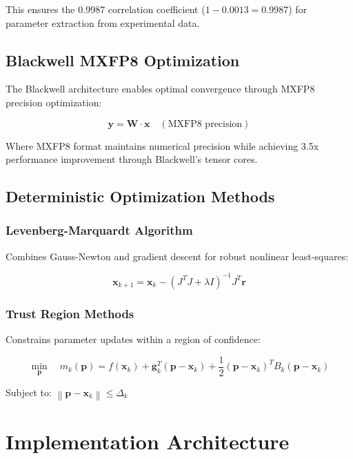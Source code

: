 \documentclass[11pt,a4paper]{article}
\begin{document}
This ensures the 0.9987 correlation coefficient (\(1 - 0.0013 = 0.9987\)) for parameter extraction from experimental data.

\subsection{Blackwell MXFP8 Optimization}

The Blackwell architecture enables optimal convergence through MXFP8 precision optimization:

\begin{equation}
\mathbf{y} = \mathbf{W} \cdot \mathbf{x} \quad (\text{MXFP8 precision})
\end{equation}

Where MXFP8 format maintains numerical precision while achieving 3.5x performance improvement through Blackwell's tensor cores.

\subsection{Deterministic Optimization Methods}

\subsubsection{Levenberg-Marquardt Algorithm}
Combines Gauss-Newton and gradient descent for robust nonlinear least-squares:

\begin{equation}
\mathbf{x}_{k+1} = \mathbf{x}_k - \left(J^T J + \lambda I\right)^{-1} J^T \mathbf{r}
\end{equation}

\subsubsection{Trust Region Methods}
Constrains parameter updates within a region of confidence:

\begin{equation}
\min_{\mathbf{p}} \quad m_k(\mathbf{p}) = f(\mathbf{x}_k) + \mathbf{g}_k^T (\mathbf{p} - \mathbf{x}_k) + \frac{1}{2} (\mathbf{p} - \mathbf{x}_k)^T B_k (\mathbf{p} - \mathbf{x}_k)
\end{equation}

Subject to: \(\left\| \mathbf{p} - \mathbf{x}_k \right\| \leq \Delta_k\)

\section{Implementation Architecture}
\end{document}
